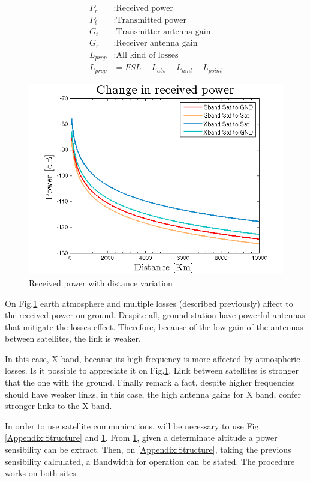 \begin{align*}
		P_r&:\text{Received power}\\
		P_t&:\text{Transmitted power}\\
		G_t&:\text{Transmitter antenna gain}\\
		G_r&:\text{Receiver antenna gain}\\
		L_{prop}&:\text{All kind of losses}\\
		L_{prop}&=FSL -L_{abs}-L_{aml}-L_{point}  	
\end{align*}

\begin{figure}[H]
\includegraphics[scale=0.9]{./sections/SatelliteDept/sections/images/friisCases}
\centering
\caption{Received power with distance variation}
\label{friis}
\end{figure}

On Fig.\ref{friis} earth atmosphere and multiple losses (described previously) affect to the received power on ground. Despite all, ground station have powerful antennas that mitigate the losses effect. Therefore, because of the low gain of the antennas between satellites, the link is weaker.

In this case, X band, because its high frequency is more affected by atmospheric losses. Is it possible to appreciate it on Fig.\ref{friis}. Link between satellites is stronger that the one with the ground. Finally remark a fact, despite higher frequencies should have weaker links, in this case, the high antenna gains for X band, confer stronger links to the X band.

In order to use satellite communications, will be necessary to use Fig.\ref{Appendix:Structure} and \ref{friis}. From \ref{friis}, given a determinate altitude a power sensibility can be extract. Then, on \ref{Appendix:Structure}, taking the previous sensibility calculated, a Bandwidth for operation can be stated. The procedure works on both sites.